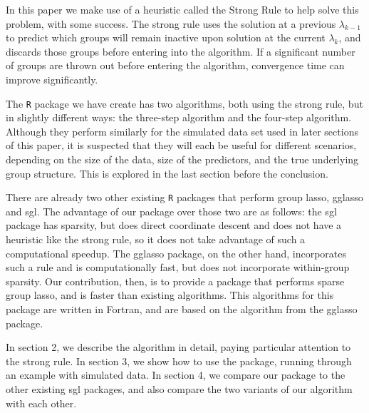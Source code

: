 \documentclass[titlepage]{article}
\begin{document}
In this paper we make use of a heuristic called the Strong Rule \citep{tibshirani2012strong} to help solve this problem, with some success. The strong rule uses the solution at a previous $\lambda_{k-1}$ to predict which groups will remain inactive upon solution at the current $\lambda_k$, and discards those groups before entering into the algorithm. If a significant number of groups are thrown out before entering the algorithm, convergence time can improve significantly.

The \texttt{R} package we have create has two algorithms, both using the strong rule, but in slightly different ways: the three-step algorithm and the four-step algorithm. Although they perform similarly for the simulated data set used in later sections of this paper, it is suspected that they will each be useful for different scenarios, depending on the size of the data, size of the predictors, and the true underlying group structure. This is explored in the last section before the conclusion.


There are already two other existing \texttt{R} packages that perform group lasso, gglasso and sgl. The advantage of our package over those two are as follows: the sgl package has sparsity, but does direct coordinate descent and does not have a heuristic like the strong rule, so it does not take advantage of such a computational speedup. The gglasso package, on the other hand, incorporates such a rule and is computationally fast, but does not incorporate within-group sparsity. Our contribution, then, is to provide a package that performs sparse group lasso, and is faster than existing algorithms. This algorithms for this package are written in Fortran, and are based on the algorithm from the gglasso package.

In section 2, we describe the algorithm in detail, paying particular attention to the strong rule. In section 3, we show how to use the package, running through an example with simulated data. In section 4, we compare our package to the other existing sgl packages, and also compare the two variants of our algorithm with each other.
\end{document}

